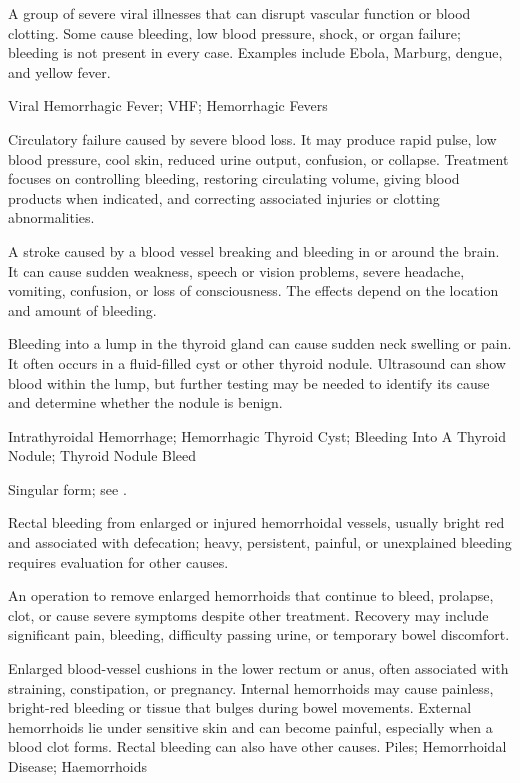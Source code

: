  A group of severe viral illnesses that can disrupt vascular function or blood clotting. Some cause bleeding, low blood pressure, shock, or organ failure; bleeding is not present in every case. Examples include Ebola, Marburg, dengue, and yellow fever.

\synonyms
Viral Hemorrhagic Fever; VHF; Hemorrhagic Fevers

 Circulatory failure caused by severe blood loss. It may produce rapid pulse, low blood pressure, cool
skin, reduced urine output, confusion, or collapse. Treatment focuses on controlling
bleeding, restoring circulating volume, giving blood products when indicated, and correcting
associated injuries or clotting abnormalities.

 A stroke caused by a blood vessel breaking and bleeding in or around the brain. It can cause sudden weakness, speech or vision problems, severe headache, vomiting, confusion, or loss of consciousness. The effects depend on the location and amount of bleeding.

 Bleeding into a lump in the thyroid gland can cause sudden neck swelling or pain. It often occurs in a fluid-filled cyst or other thyroid nodule. Ultrasound can show blood within the lump, but further testing may be needed to identify its cause and determine whether the nodule is benign.

\synonyms
Intrathyroidal Hemorrhage; Hemorrhagic Thyroid Cyst; Bleeding Into A Thyroid Nodule; Thyroid Nodule Bleed

 Singular form; see .

 Rectal bleeding from enlarged or injured hemorrhoidal vessels, usually bright red and associated with defecation; heavy, persistent, painful, or unexplained bleeding requires evaluation for other causes.

 An operation to remove enlarged hemorrhoids that continue to bleed, prolapse, clot, or cause severe symptoms despite other treatment. Recovery may include significant pain, bleeding, difficulty passing urine, or temporary bowel discomfort.

 Enlarged blood-vessel cushions in the lower rectum or anus, often associated with straining, constipation, or pregnancy. Internal hemorrhoids may cause painless, bright-red bleeding or tissue that bulges during bowel movements. External hemorrhoids lie under sensitive skin and can become painful, especially when a blood clot forms. Rectal bleeding can also have other causes.
\synonyms
Piles; Hemorrhoidal Disease; Haemorrhoids

